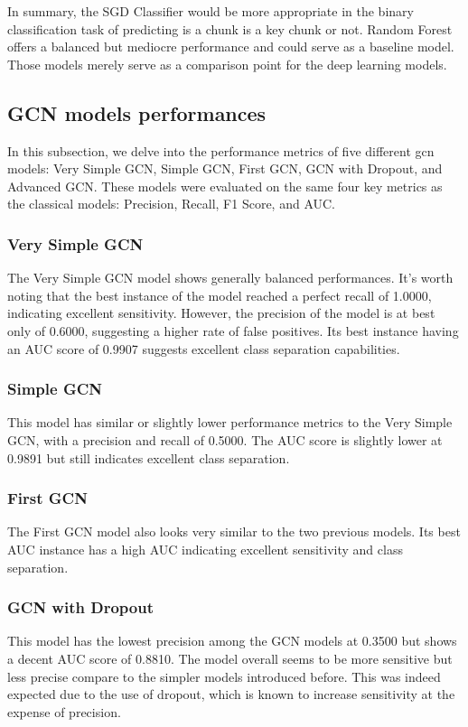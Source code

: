 In summary, the SGD Classifier would be more appropriate in the binary classification task of predicting is a chunk is a key chunk or not. Random Forest offers a balanced but mediocre performance and could serve as a baseline model. Those models merely serve as a comparison point for the deep learning models.

\subsection{GCN models performances}

In this subsection, we delve into the performance metrics of five different \acrfull{gcn} models: Very Simple GCN, Simple GCN, First GCN, GCN with Dropout, and Advanced GCN. These models were evaluated on the same four key metrics as the classical models: Precision, Recall, F1 Score, and AUC.

\subsubsection{Very Simple GCN}
The Very Simple GCN model shows generally balanced performances. It's worth noting that the best instance of the model reached a perfect recall of 1.0000, indicating excellent sensitivity. However, the precision of the model is at best only of 0.6000, suggesting a higher rate of false positives. Its best instance having an AUC score of 0.9907 suggests excellent class separation capabilities.

\subsubsection{Simple GCN}
This model has similar or slightly lower performance metrics to the Very Simple GCN, with a precision and recall of 0.5000. The AUC score is slightly lower at 0.9891 but still indicates excellent class separation.

\subsubsection{First GCN}
The First GCN model also looks very similar to the two previous models. Its best AUC instance has a high AUC indicating excellent sensitivity and class separation. 

\subsubsection{GCN with Dropout}
This model has the lowest precision among the GCN models at 0.3500 but shows a decent AUC score of 0.8810. The model overall seems to be more sensitive but less precise compare to the simpler models introduced before. This was indeed expected due to the use of dropout, which is known to increase sensitivity at the expense of precision.

